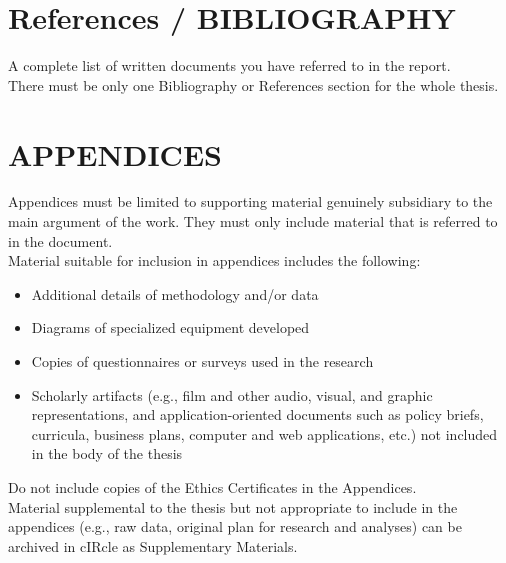 \chapter{References / BIBLIOGRAPHY}
  A complete list of written documents you have referred to in the report. \\
  There must be only one Bibliography or References section for the whole thesis.

\chapter{APPENDICES}
  Appendices must be limited to supporting material genuinely subsidiary to the main argument of the 
    work. They must only include material that is referred to in the document. \\
  Material suitable for inclusion in appendices includes the following:
  \begin{itemize} 
    \item Additional details of methodology and/or data
    \item Diagrams of specialized equipment developed
    \item Copies of questionnaires or surveys used in the research
    \item Scholarly artifacts (e.g., film and other audio, visual, and graphic representations, and 
      application-oriented documents such as policy briefs, curricula, business plans, computer and 
      web applications, etc.) not included in the body of the thesis
  \end{itemize}
  Do not include copies of the Ethics Certificates in the Appendices. \\
  Material supplemental to the thesis but not appropriate to include in the appendices (e.g., raw 
    data, original plan for research and analyses) can be archived in cIRcle as Supplementary 
    Materials.




